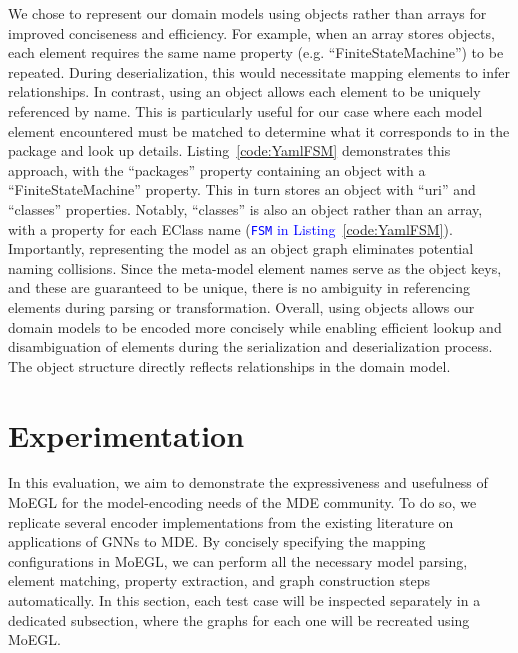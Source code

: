 \documentclass[journal,article,submit,moreauthors,technologies]{Definitions/mdpi}
\newcommand{\rev}[1]{\textcolor{blue}{#1}}
\begin{document}
We chose to represent our domain models using objects rather than arrays for improved conciseness and efficiency.
For example, when an array stores objects, each element requires the same name property (e.g. ``FiniteStateMachine'') to be repeated. During deserialization, this would necessitate mapping elements to infer relationships. In contrast, using an object allows each element to be uniquely referenced by name. This is particularly useful for our case where each model element encountered must be matched to determine what it corresponds to in the package and look up details. Listing~\ref{code:YamlFSM} demonstrates this approach, with the ``packages'' property containing an object with a ``FiniteStateMachine'' property. This in turn stores an object with ``uri'' and ``classes'' properties. Notably, ``classes'' is also an object rather than an array, with a property for each EClass name (\rev{\texttt{FSM} in Listing~\ref{code:YamlFSM}}). Importantly, representing the model as an object graph eliminates potential naming collisions. Since the meta-model element names serve as the object keys, and these are guaranteed to be unique, there is no ambiguity in referencing elements during parsing or transformation. Overall, using objects allows our domain models to be encoded more concisely while enabling efficient lookup and disambiguation of elements during the serialization and deserialization process. The object structure directly reflects relationships in the domain model.

\section{Experimentation} \label{Sec:Experiments}

In this evaluation, we aim to demonstrate the expressiveness and usefulness of MoEGL for the model-encoding needs of the MDE community.
To do so, we replicate several encoder implementations from the existing literature on applications of GNNs to MDE. By concisely specifying the mapping configurations in MoEGL, we can perform all the necessary model parsing, element matching, property extraction, and graph construction steps automatically. In this section, each test case will be inspected separately in a dedicated subsection, where the graphs for each one will be recreated using MoEGL.
\end{document}

